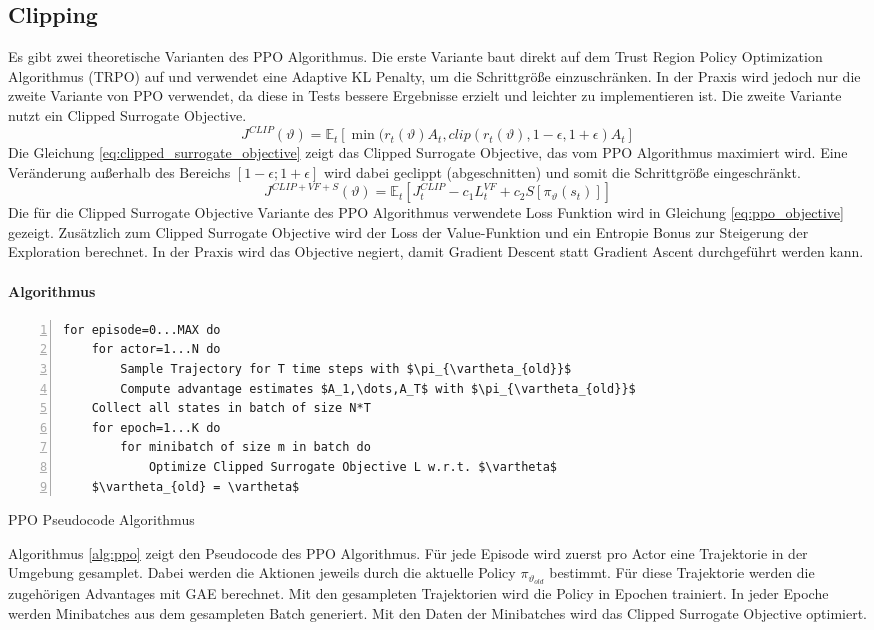 \subsection{Clipping}
Es gibt zwei theoretische Varianten des PPO Algorithmus. Die erste Variante baut direkt auf dem Trust Region Policy Optimization Algorithmus (TRPO) auf und verwendet eine Adaptive KL Penalty, um die Schrittgröße einzuschränken. In der Praxis wird jedoch nur die zweite Variante von PPO verwendet, da diese in Tests bessere Ergebnisse erzielt und leichter zu implementieren ist.
Die zweite Variante nutzt ein Clipped Surrogate Objective.
\begin{equation}
    J^{CLIP}(\vartheta) = \mathbb{E}_t\left[ \min(r_t(\vartheta)A_t,clip(r_t(\vartheta),1-\epsilon,1+\epsilon)A_t \right]
    \label{eq:clipped_surrogate_objective}
\end{equation}
Die Gleichung \ref{eq:clipped_surrogate_objective} zeigt das Clipped Surrogate Objective, das vom PPO Algorithmus maximiert wird. Eine Veränderung außerhalb des Bereichs $[1-\epsilon; 1+\epsilon]$ wird dabei geclippt (abgeschnitten) und somit die Schrittgröße eingeschränkt.
\begin{equation}
    J^{CLIP+VF+S}(\vartheta) = \mathbb{E}_t \left[ J_t^{CLIP} - c_1L_t^{VF} + c_2S[\pi_\vartheta(s_t)] \right]
    \label{eq:ppo_objective}
\end{equation}
Die für die Clipped Surrogate Objective Variante des PPO Algorithmus verwendete Loss Funktion wird in Gleichung \ref{eq:ppo_objective} gezeigt. Zusätzlich zum Clipped Surrogate Objective wird der Loss der Value-Funktion und ein Entropie Bonus zur Steigerung der Exploration berechnet. In der Praxis wird das Objective negiert, damit Gradient Descent statt Gradient Ascent durchgeführt werden kann.

\paragraph{Algorithmus}

\begin{algorithm}
\begin{lstlisting}[mathescape=true, numbers=left]
for episode=0...MAX do
    for actor=1...N do
        Sample Trajectory for T time steps with $\pi_{\vartheta_{old}}$
        Compute advantage estimates $A_1,\dots,A_T$ with $\pi_{\vartheta_{old}}$
    Collect all states in batch of size N*T
    for epoch=1...K do
        for minibatch of size m in batch do
            Optimize Clipped Surrogate Objective L w.r.t. $\vartheta$
    $\vartheta_{old} = \vartheta$
\end{lstlisting}
\caption{PPO Pseudocode Algorithmus}
\label{alg:ppo}
\end{algorithm}

Algorithmus \ref{alg:ppo} zeigt den Pseudocode des PPO Algorithmus. Für jede Episode wird zuerst pro Actor eine Trajektorie in der Umgebung gesamplet. Dabei werden die Aktionen jeweils durch die aktuelle Policy $\pi_{\vartheta_{old}}$ bestimmt. Für diese Trajektorie werden die zugehörigen Advantages mit GAE berechnet. 
Mit den gesampleten Trajektorien wird die Policy in Epochen trainiert. In jeder Epoche werden Minibatches aus dem gesampleten Batch generiert. Mit den Daten der Minibatches wird das Clipped Surrogate Objective optimiert.